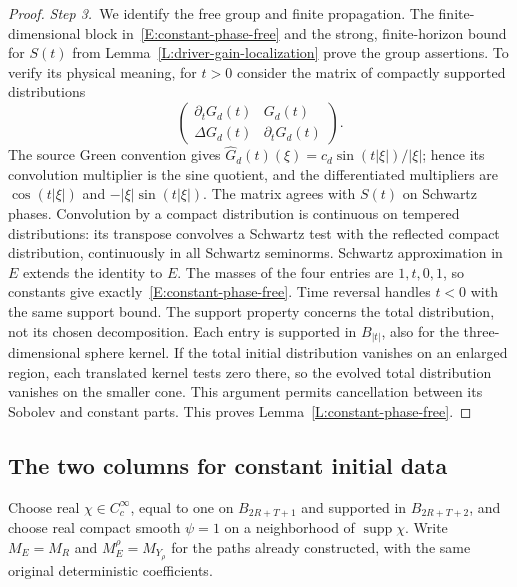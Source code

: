 \begin{proof}
  \medskip
  \noindent\textit{Step 3.~}We identify the free group and finite propagation.
  The finite-dimensional block in~\eqref{E:constant-phase-free} and the strong,
  finite-horizon bound for $S(t)$ from Lemma~\ref{L:driver-gain-localization}
  prove the group assertions. To verify its physical meaning, for $t > 0$
  consider the matrix of compactly supported distributions
  \[
    \begin{pmatrix}
      \partial_tG_d(t)&G_d(t)\\
      \Delta G_d(t)&\partial_tG_d(t)
    \end{pmatrix}.
  \]
  The source Green convention gives $\widehat{G}_d(t)(\xi) =
  c_d\sin(t|\xi|)/|\xi|$; hence its convolution multiplier is the sine quotient,
  and the differentiated multipliers are $\cos(t|\xi|)$ and
  $-|\xi|\sin(t|\xi|)$. The matrix agrees with $S(t)$ on Schwartz phases.
  Convolution by a compact distribution is continuous on tempered distributions:
  its transpose convolves a Schwartz test with the reflected compact
  distribution, continuously in all Schwartz seminorms. Schwartz approximation
  in $E$ extends the identity to $E$. The masses of the four entries are
  $1,t,0,1$, so constants give exactly~\eqref{E:constant-phase-free}. Time
  reversal handles $t < 0$ with the same support bound. The support property
  concerns the total distribution, not its chosen decomposition. Each entry is
  supported in $B_{|t|}$, also for the
  three-dimensional sphere kernel. If the total initial distribution vanishes on
  an enlarged region, each translated kernel tests zero there, so the evolved
  total distribution vanishes on the smaller cone. This argument permits
  cancellation between its Sobolev and constant parts. This proves
  Lemma~\ref{L:constant-phase-free}.
\end{proof}

\subsection{The two columns for constant initial data}

Choose real $\chi \in C_c^\infty$, equal to one on $B_{2R+T+1}$ and supported in
$B_{2R+T+2}$, and choose real compact smooth $\psi = 1$ on a neighborhood of
$\operatorname{supp}\chi$. Write $M_E = M_R$ and $M_E^\rho = M_{Y_\rho}$ for the
paths already constructed, with the same original deterministic coefficients.

